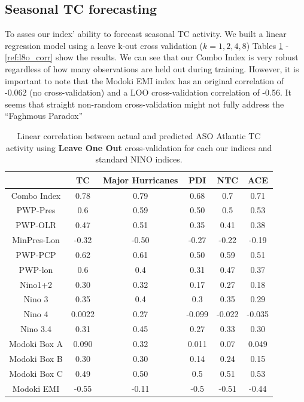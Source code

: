 \documentclass[]{article}
\begin{document}
\subsection{Seasonal TC forecasting}
To asses our index' ability to forecast seasonal TC activity. We built a linear regression model using a leave k-out cross validation ($k=1,2,4,8$) Tables \ref{ref:l1o_corr} - \ref{ref:l8o_corr} show the results. We can see that our Combo Index is very robust regardless of how many observations are held out during training. However, it is important to note that the Modoki EMI index has an original correlation of -0.062 (no cross-validation) and a LOO cross-validation correlation of -0.56. It seems that straight non-random cross-validation might not fully address the ``Faghmous Paradox''

\begin{table}
\begin{tabular}{cccccc}
\hline
& TC & Major Hurricanes & PDI & NTC & ACE\\
\hline
Combo Index & 0.78 & 0.79 & 0.68 & 0.7 & 0.71\\
PWP-Pres & 0.6 & 0.59 & 0.50 & 0.5 & 0.53\\
PWP-OLR & 0.47 & 0.51 & 0.35 & 0.41 & 0.38\\
MinPres-Lon & -0.32 & -0.50 & -0.27 & -0.22 & -0.19\\
PWP-PCP & 0.62 & 0.61 & 0.50 & 0.59 & 0.51\\
PWP-lon & 0.6 & 0.4 & 0.31 & 0.47 & 0.37\\
Nino1+2 & 0.30 & 0.32 & 0.17 & 0.27 & 0.18\\
Nino 3 & 0.35 & 0.4 & 0.3 & 0.35 & 0.29\\
Nino 4 & 0.0022 & 0.27 & -0.099 & -0.022 & -0.035\\
Nino 3.4 & 0.31 & 0.45 & 0.27 & 0.33 & 0.30\\
Modoki Box A & 0.090 & 0.32 & 0.011 & 0.07 & 0.049\\
Modoki Box B & 0.30 & 0.30 & 0.14 & 0.24 & 0.15\\
Modoki Box C & 0.49 & 0.50 & 0.5 & 0.51 & 0.53\\
Modoki EMI & -0.55 & -0.11 & -0.5 & -0.51 & -0.44\\
\hline
\end{tabular}
\caption{Linear correlation between actual and predicted ASO Atlantic TC activity using \textbf{Leave One Out} cross-validation for each our indices and standard NINO indices.}
\label{ref:l1o_corr}
\end{table}
\end{document}
